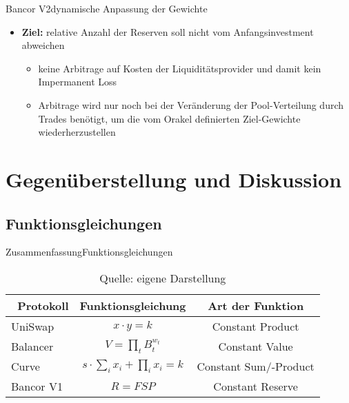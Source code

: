 \documentclass{beamer}
\begin{document}
\begin{frame}{Bancor V2}{dynamische Anpassung der Gewichte}
\begin{itemize}
 \item{\textbf{Ziel:} relative Anzahl der Reserven soll nicht vom Anfangsinvestment abweichen} 
   \vspace{1em}\begin{itemize}
   \item{keine Arbitrage auf Kosten der Liquiditätsprovider und damit kein Impermanent Loss} %
   \vspace{1em}
   \item{Arbitrage wird nur noch bei der Veränderung der Pool-Verteilung durch Trades benötigt, um die vom Orakel definierten Ziel-Gewichte wiederherzustellen}
   \end{itemize} 
\end{itemize}
\end{frame}

\section{Gegenüberstellung und Diskussion}

\subsection{Funktionsgleichungen}

\begin{frame}{Zusammenfassung}{Funktionsgleichungen}
  \begin{table}
\renewcommand{\arraystretch}{1.5}
  \center
  \begin{tabular}{lcc}
    \hline\hline\
    Protokoll & Funktionsgleichung & Art der Funktion  \\ \hline
    UniSwap & $ x\cdot y=k$ & Constant Product  \\    
    Balancer & $V=\prod_t B_{t}^{w_{t}}$ & Constant Value \\ 
    Curve & $s\cdot \sum_i x_{i}+\prod_i x_{i} = k $ & Constant Sum/-Product  \\
    Bancor V1 & $R=FSP$ & Constant Reserve \\
    \hline\hline
  \end{tabular}
  \caption{\tiny{Quelle: eigene Darstellung}}
\end{table}
\end{frame}
\end{document}
